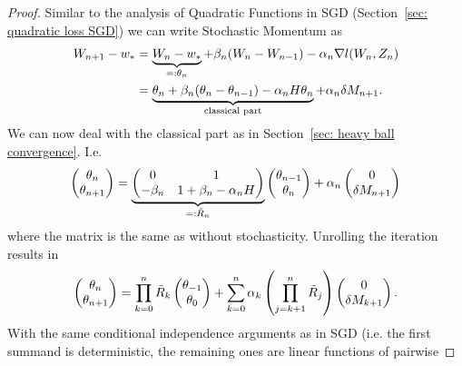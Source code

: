 \begin{proof}
	Similar to the analysis of Quadratic Functions in SGD (Section~\ref{sec: quadratic loss SGD})
	we can write Stochastic Momentum as
	\begin{align*}
		W_{n+1} - w_*
		&= \underbrace{W_n - w_*}_{=:\theta_n}
		+ \beta_n(W_n - W_{n-1})
		- \alpha_n \nabla l(W_n, Z_n)\\
		&= \underbrace{\theta_n + \beta_n(\theta_n-\theta_{n-1}) - \alpha_n H\theta_n}_{\text{classical part}}
		+ \alpha_n \delta M_{n+1}.
	\end{align*}
	We can now deal with the classical part as in Section~\ref{sec: heavy ball convergence}. I.e.
	\begin{align*}
		\begin{pmatrix}
			\theta_n \\
			\theta_{n+1}
		\end{pmatrix}
		= \underbrace{\begin{pmatrix}
			0 & 1\\
			-\beta_n & 1 + \beta_n -\alpha_n H
		\end{pmatrix}}_{=:\tilde{R}_n}
		\begin{pmatrix}
			\theta_{n-1}\\
			\theta_n
		\end{pmatrix}
		+ \alpha_n \begin{pmatrix}
			0\\
			\delta M_{n+1}
		\end{pmatrix}
	\end{align*}
	where the matrix is the same as without stochasticity.
	Unrolling the iteration results in
	\begin{align*}
		\begin{pmatrix}
			\theta_n \\
			\theta_{n+1}
		\end{pmatrix}
		= \prod_{k=0}^n \tilde{R}_k
		\begin{pmatrix}
			\theta_{-1}\\
			\theta_0
		\end{pmatrix}
		+ \sum_{k=0}^n \alpha_k\left(\prod_{j=k+1}^n \tilde{R}_j\right)
		\begin{pmatrix}
			0\\
			\delta M_{k+1}
		\end{pmatrix}.
	\end{align*}
	With the same conditional independence arguments as in SGD (i.e. the first
	summand is deterministic, the remaining ones are linear functions of pairwise

\end{proof}
